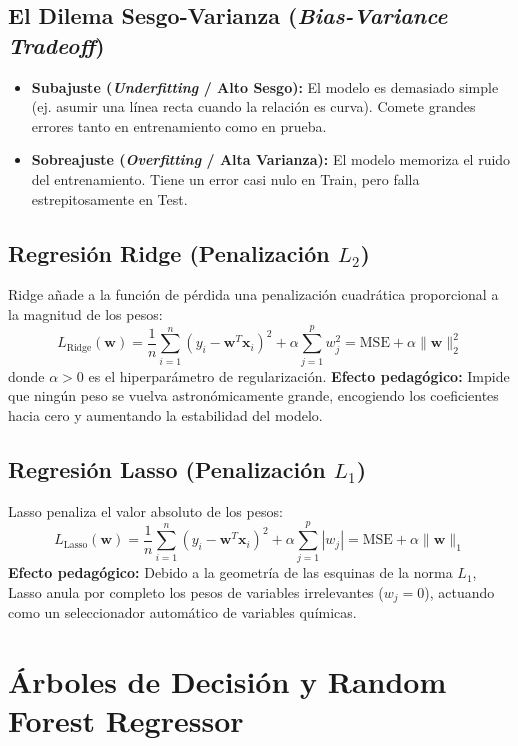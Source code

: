 \documentclass[11pt,letterpaper]{report}
\begin{document}
\subsection{El Dilema Sesgo-Varianza (\textit{Bias-Variance Tradeoff})}
\begin{itemize}[leftmargin=*]
    \item \textbf{Subajuste (\textit{Underfitting} / Alto Sesgo):} El modelo es demasiado simple (ej. asumir una línea recta cuando la relación es curva). Comete grandes errores tanto en entrenamiento como en prueba.
    \item \textbf{Sobreajuste (\textit{Overfitting} / Alta Varianza):} El modelo memoriza el ruido del entrenamiento. Tiene un error casi nulo en Train, pero falla estrepitosamente en Test.
\end{itemize}

\subsection{Regresión Ridge (Penalización $L_2$)}
Ridge añade a la función de pérdida una penalización cuadrática proporcional a la magnitud de los pesos:
\begin{equation}
    L_{\text{Ridge}}(\mathbf{w}) = \frac{1}{n} \sum_{i=1}^n (y_i - \mathbf{w}^T \mathbf{x}_i)^2 + \alpha \sum_{j=1}^p w_j^2 = \text{MSE} + \alpha \|\mathbf{w}\|_2^2
\end{equation}
donde $\alpha > 0$ es el hiperparámetro de regularización.  
\textbf{Efecto pedagógico:} Impide que ningún peso se vuelva astronómicamente grande, encogiendo los coeficientes hacia cero y aumentando la estabilidad del modelo.

\subsection{Regresión Lasso (Penalización $L_1$)}
Lasso penaliza el valor absoluto de los pesos:
\begin{equation}
    L_{\text{Lasso}}(\mathbf{w}) = \frac{1}{n} \sum_{i=1}^n (y_i - \mathbf{w}^T \mathbf{x}_i)^2 + \alpha \sum_{j=1}^p |w_j| = \text{MSE} + \alpha \|\mathbf{w}\|_1
\end{equation}
\textbf{Efecto pedagógico:} Debido a la geometría de las esquinas de la norma $L_1$, Lasso anula por completo los pesos de variables irrelevantes ($w_j = 0$), actuando como un seleccionador automático de variables químicas.

\section{Árboles de Decisión y Random Forest Regressor}
\end{document}
